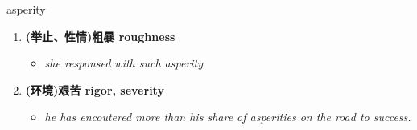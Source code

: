 
\begin{frame}
{\huge asperity}
\begin{center}
\begin{enumerate}\Large
  \item \textbf{(举止、性情)粗暴 roughness}
  \begin{itemize}
    \item \em{\Large{she responsed with such asperity}}
  \end{itemize}
  \item \textbf{(环境)艰苦 rigor, severity}
  \begin{itemize}
    \item \em{\Large{he has encoutered more than his share of asperities on the road to success.}}
  \end{itemize}
\end{enumerate}
\end{center}
\end{frame}
